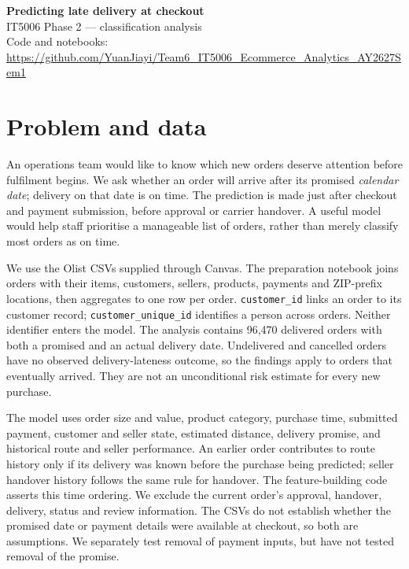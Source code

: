 \documentclass[11pt,a4paper]{article}
\begin{document}
\begin{center}
{\Large\bfseries Predicting late delivery at checkout}\\[3pt]
{\small IT5006 Phase 2 --- classification analysis}\\[2pt]
{\footnotesize Code and notebooks: \url{https://github.com/YuanJiayi/Team6_IT5006_Ecommerce_Analytics_AY2627Sem1}}
\end{center}
\vspace{-0.5em}

\section*{Problem and data}
An operations team would like to know which new orders deserve attention before fulfilment begins. We ask whether an order will arrive after its promised \emph{calendar date}; delivery on that date is on time. The prediction is made just after checkout and payment submission, before approval or carrier handover. A useful model would help staff prioritise a manageable list of orders, rather than merely classify most orders as on time.

We use the Olist CSVs supplied through Canvas. The preparation notebook joins orders with their items, customers, sellers, products, payments and ZIP-prefix locations, then aggregates to one row per order. \texttt{customer\_id} links an order to its customer record; \texttt{customer\_unique\_id} identifies a person across orders. Neither identifier enters the model. The analysis contains 96,470 delivered orders with both a promised and an actual delivery date. Undelivered and cancelled orders have no observed delivery-lateness outcome, so the findings apply to orders that eventually arrived. They are not an unconditional risk estimate for every new purchase.

The model uses order size and value, product category, purchase time, submitted payment, customer and seller state, estimated distance, delivery promise, and historical route and seller performance. An earlier order contributes to route history only if its delivery was known before the purchase being predicted; seller handover history follows the same rule for handover. The feature-building code asserts this time ordering. We exclude the current order's approval, handover, delivery, status and review information. The CSVs do not establish whether the promised date or payment details were available at checkout, so both are assumptions. We separately test removal of payment inputs, but have not tested removal of the promise.
\end{document}
